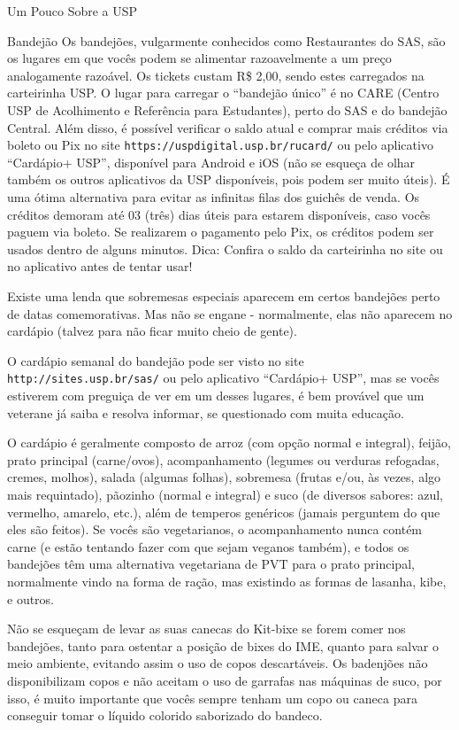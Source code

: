\begin{secao}{Um Pouco Sobre a USP}
\begin{subsecao}{Bandejão}
Os bandejões, vulgarmente conhecidos como Restaurantes do SAS, são os lugares
em que vocês podem se alimentar razoavelmente a um preço analogamente razoável.
Os tickets custam R\$ 2,00, sendo estes carregados na carteirinha USP. O
lugar para carregar o ``bandejão único'' é no CARE (Centro USP de Acolhimento e 
Referência para Estudantes), perto do SAS e do bandejão Central. Além disso, é 
possível verificar o saldo atual e comprar mais créditos via boleto ou Pix no site
{\tt https://uspdigital.usp.br/rucard/} ou pelo aplicativo ``Cardápio+ USP'',
disponível para Android e iOS (não se esqueça de olhar também os outros
aplicativos da USP disponíveis, pois podem ser muito úteis).
É uma ótima alternativa para evitar as infinitas filas dos guichês de venda. Os
créditos demoram até 03 (três) dias úteis para estarem disponíveis, caso vocês
paguem via boleto. Se realizarem o pagamento pelo Pix, os créditos podem ser usados
dentro de alguns minutos.
Dica: Confira o saldo da carteirinha no site ou no aplicativo antes de tentar usar!

Existe uma lenda que sobremesas especiais aparecem em certos bandejões perto de
datas comemorativas. Mas não se engane - normalmente, elas não aparecem no
cardápio (talvez para não ficar muito cheio de gente).


O cardápio semanal do bandejão pode ser visto no site {\tt
http://sites.usp.br/sas/} ou pelo aplicativo ``Cardápio+ USP'', mas se vocês
estiverem com preguiça de ver em um desses lugares, é bem provável que um veterane 
já saiba e resolva informar, se questionado com muita educação.

O cardápio é geralmente composto de arroz (com opção normal e integral), feijão,
prato principal (carne/ovos), acompanhamento (legumes ou verduras refogadas,
cremes, molhos), salada (algumas folhas), sobremesa (frutas e/ou, às vezes, algo mais
requintado), pãozinho (normal e integral) e suco (de diversos sabores: azul, vermelho,
amarelo, etc.), além de temperos genéricos (jamais perguntem do que eles são feitos). 
Se vocês são vegetarianos, o acompanhamento nunca contém carne (e estão tentando 
fazer com que sejam veganos também), e todos os bandejões têm uma alternativa 
vegetariana de PVT para o prato principal, normalmente vindo na forma de ração,
mas existindo as formas de lasanha, kibe, e outros.


Não se esqueçam de levar as suas canecas do Kit-bixe se forem comer nos
bandejões, tanto para ostentar a posição de bixes do IME, quanto para salvar o
meio ambiente, evitando assim o uso de copos descartáveis. Os badenjões não 
disponibilizam copos e não aceitam o uso de garrafas nas máquinas de suco, por 
isso, é muito importante que vocês sempre tenham um copo ou caneca para conseguir 
tomar o líquido colorido saborizado do bandeco.



\end{subsecao}
\end{secao}
